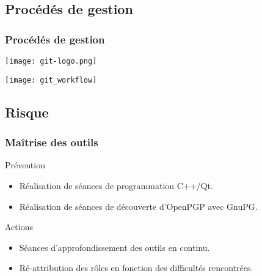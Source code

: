 \subsection{Procédés de gestion}
\begin{frame}
  \frametitle{\color{white} Procédés de gestion}
  \hfill
  \texttt{[image: git-logo.png]}
  \begin{center}
    \texttt{[image: git\_workflow]}
  \end{center}
\end{frame}

\subsection{Risque}
\begin{frame}
  \frametitle{\color{white} Maîtrise des outils}
  \begin{block}{Prévention}
    \begin{itemize}
      \item Réalisation de séances de programmation C++/Qt.
      \item Réalisation de séances de découverte d'OpenPGP avec GnuPG.
    \end{itemize}
  \end{block}
  \begin{block}{Actions}
    \begin{itemize}
      \item Séances d'approfondissement des outils en continu.
      \item Ré-attribution des rôles en fonction des difficultés rencontrées.
    \end{itemize}
  \end{block}
\end{frame}


